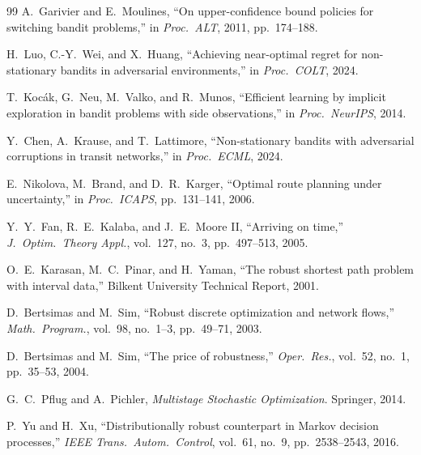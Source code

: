 \documentclass[11pt]{article}
\theoremstyle{definition}
\theoremstyle{remark}
\begin{document}
\begin{thebibliography}{99}
A.~Garivier and E.~Moulines, ``On upper-confidence bound policies for switching bandit problems,'' in \emph{Proc.\ ALT}, 2011, pp.~174--188.

H.~Luo, C.-Y.~Wei, and X.~Huang, ``Achieving near-optimal regret for non-stationary bandits in adversarial environments,'' in \emph{Proc.\ COLT}, 2024.

T.~Koc\'{a}k, G.~Neu, M.~Valko, and R.~Munos, ``Efficient learning by implicit exploration in bandit problems with side observations,'' in \emph{Proc.\ NeurIPS}, 2014.

Y.~Chen, A.~Krause, and T.~Lattimore, ``Non-stationary bandits with adversarial corruptions in transit networks,'' in \emph{Proc.\ ECML}, 2024.

E.~Nikolova, M.~Brand, and D.~R.~Karger, ``Optimal route planning under uncertainty,'' in \emph{Proc.\ ICAPS}, pp.~131--141, 2006.

Y.~Y.~Fan, R.~E.~Kalaba, and J.~E.~Moore II, ``Arriving on time,'' \emph{J.\ Optim.\ Theory Appl.}, vol.~127, no.~3, pp.~497--513, 2005.

O.~E.~Karasan, M.~C.~Pinar, and H.~Yaman, ``The robust shortest path problem with interval data,'' Bilkent University Technical Report, 2001.

D.~Bertsimas and M.~Sim, ``Robust discrete optimization and network flows,'' \emph{Math.\ Program.}, vol.~98, no.~1--3, pp.~49--71, 2003.

D.~Bertsimas and M.~Sim, ``The price of robustness,'' \emph{Oper.\ Res.}, vol.~52, no.~1, pp.~35--53, 2004.

G.~C.~Pflug and A.~Pichler, \emph{Multistage Stochastic Optimization}. Springer, 2014.

P.~Yu and H.~Xu, ``Distributionally robust counterpart in Markov decision processes,'' \emph{IEEE Trans.\ Autom.\ Control}, vol.~61, no.~9, pp.~2538--2543, 2016.

\end{thebibliography}
\end{document}
